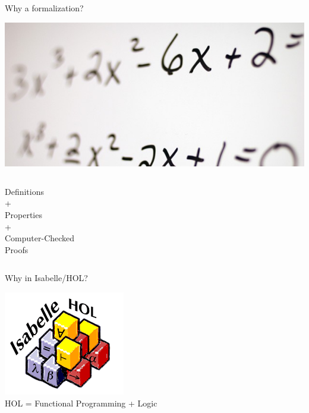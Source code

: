 \documentclass[xcolor=dvipsnames]{beamer}
\begin{document}
\begin{frame}{Why a formalization?}
  \begin{center}
    \includegraphics[scale=0.2]{whiteboard_math.jpg} \\
    \vspace{20pt}
    \begin{columns}[c]
      \flushright{=}
      \begin{center}
        Definitions \\ + \\
        Properties \\ + \\
        Computer-Checked \\ Proofs
      \end{center}
    \end{columns}
  \end{center}
\end{frame}


\begin{frame}{Why in Isabelle/HOL?}
  \begin{center}
    \includegraphics[scale=0.6]{isabelle_hol.png} \\
    \vspace{20pt}
    HOL = Functional Programming + Logic
  \end{center}
\end{frame}
\end{document}
